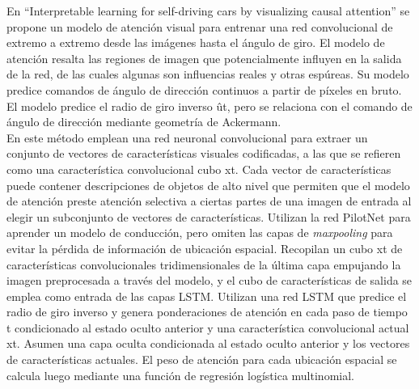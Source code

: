 En ``Interpretable  learning  for  self-driving  cars  by visualizing  causal  attention'' \cite{interpretable} se propone un modelo de atención visual para entrenar una red convolucional de extremo a extremo desde las imágenes hasta el ángulo de giro. El modelo de atención resalta las regiones de imagen que potencialmente influyen en la salida de la red, de las cuales algunas son influencias reales y otras espúreas. Su modelo predice comandos de ángulo de dirección continuos a partir de píxeles en bruto. El modelo predice el radio de giro inverso ût, pero se relaciona con el comando de ángulo de dirección mediante geometría de Ackermann. \\

En este método emplean una red neuronal convolucional para extraer un conjunto de vectores de características visuales codificadas, a las que se refieren como una característica convolucional cubo xt. Cada vector de características puede contener descripciones de objetos de alto nivel que permiten que el modelo de atención preste atención selectiva a ciertas partes de una imagen de entrada al elegir un subconjunto de vectores de características. Utilizan la red PilotNet \cite{end2end} para aprender un modelo de conducción, pero omiten las capas de \textit{maxpooling} para evitar la pérdida de información de ubicación espacial. Recopilan un cubo xt de características convolucionales tridimensionales de la última capa empujando la imagen preprocesada a través del modelo, y el cubo de características de salida se emplea como entrada de las capas LSTM. Utilizan una red LSTM que predice el radio de giro inverso y genera ponderaciones de atención en cada paso de tiempo t condicionado al estado oculto anterior y una característica convolucional actual xt. Asumen una capa oculta condicionada al estado oculto anterior y los vectores de características actuales. El peso de atención para cada ubicación espacial se calcula luego mediante una función de regresión logística multinomial.\\

